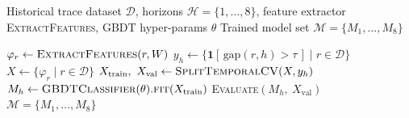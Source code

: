 \begin{algorithm}
\caption{GBDT Offline Training}
\label{alg:gbdt-training}
\begin{algorithmic}[1]
\Require Historical trace dataset $\mathcal{D}$, horizons $\mathcal{H}=\{1,\ldots,8\}$,
         feature extractor \textsc{ExtractFeatures}, GBDT hyper-params $\theta$
\Ensure Trained model set $\mathcal{M} = \{M_1, \ldots, M_8\}$

  \State {}
    \State $\varphi_r \leftarrow \textsc{ExtractFeatures}(r, W)$
  \EndFor
  \State {}
    \State $y_h \leftarrow \{\mathbf{1}[\,\text{gap}(r,h) > \tau\,] \mid r \in \mathcal{D}\}$
    \State $X \leftarrow \{\varphi_r \mid r \in \mathcal{D}\}$
    \State $X_{\text{train}},\ X_{\text{val}} \leftarrow \textsc{SplitTemporalCV}(X, y_h)$
    \State $M_h \leftarrow \textsc{GBDTClassifier}(\theta).\textsc{fit}(X_{\text{train}})$
    \State \textsc{Evaluate}$(M_h,\ X_{\text{val}})$
  \EndFor
  \State \Return $\mathcal{M} = \{M_1, \ldots, M_8\}$
\EndProcedure
\end{algorithmic}
\end{algorithm}
